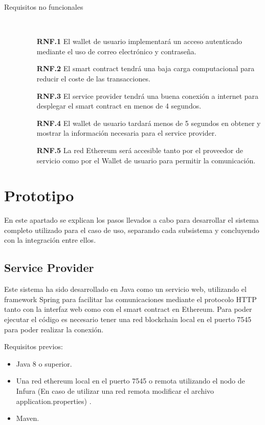 \documentclass[12pt]{report}
\begin{document}
\begin{description}
\item[Requisitos no funcionales]\
	\begin{itemize}
	\item[\textbf{RNF.1}]El wallet de usuario implementará un acceso autenticado mediante el uso de correo electrónico y contraseña.
	\item[\textbf{RNF.2}]El smart contract tendrá una baja carga computacional para reducir el coste de las transacciones.
	\item[\textbf{RNF.3}]El service provider tendrá una buena conexión a internet para desplegar el smart contract en menos de 4 segundos.
	\item[\textbf{RNF.4}]El wallet de usuario tardará menos de 5 segundos en obtener y mostrar la información necesaria para el service provider.
	\item[\textbf{RNF.5}]La red Ethereum será accesible tanto por el proveedor de servicio como por el Wallet de usuario para permitir la comunicación.
	\end{itemize}
\end{description}

\section{Prototipo}
En este apartado se explican los pasos llevados a cabo para desarrollar el sistema completo utilizado para el caso de uso, separando cada subsistema y concluyendo con la integración entre ellos.

\subsection{Service Provider}
Este sistema ha sido desarrollado en Java como un servicio web, utilizando el framework Spring para facilitar las comunicaciones mediante el protocolo HTTP tanto con la interfaz web como con el smart contract en Ethereum.
Para poder ejecutar el código es necesario tener una red blockchain local en el puerto 7545 para poder realizar la conexión. 
\begin{description}
\item Requisitos previos:
	\begin{itemize}
	\item Java 8 o superior.
	\item Una red ethereum local en el puerto 7545 o remota utilizando el nodo de Infura (En caso de utilizar una red remota modificar el archivo application.properties) .
	\item Maven.
	\end{itemize}
\end{description}
\end{document}

